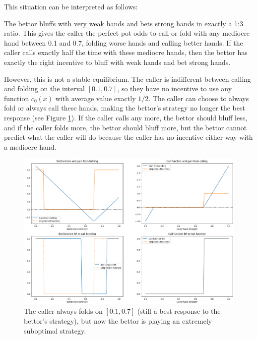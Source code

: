 \documentclass[a4paper,12pt]{article}
\begin{document}
This situation can be interpreted as follows:

The bettor bluffs with very weak hands and bets strong hands in exactly a 1:3 ratio. This gives the caller the perfect pot odds to call or fold with any mediocre hand between 0.1 and 0.7, folding worse hands and calling better hands. If the caller calls exactly half the time with these mediocre hands, then the bettor has exactly the right incentive to bluff with weak hands and bet strong hands. 

However, this is not a stable equilibrium. The caller is indifferent between calling and folding on the interval $[0.1, 0.7]$, so they have no incentive to use any function $c_0(x)$ with average value exactly $1/2$. The caller can choose to always fold or always call these hands, making the bettor's strategy no longer the best response (see Figure \ref{unstable}). If the caller calls any more, the bettor should bluff less, and if the caller folds more, the bettor should bluff more, but the bettor cannot predict what the caller will do because the caller has no incentive either way with a mediocre hand.


\begin{figure}[h]
    \begin{center}
    \includegraphics*[scale=0.4]{../unstable.png}
    \caption{The caller always folds on $[0.1, 0.7]$ (still a best response to the bettor's strategy), but now the bettor is playing an extremely suboptimal strategy.}
    \label{unstable}
    \end{center}
\end{figure}
\end{document}
